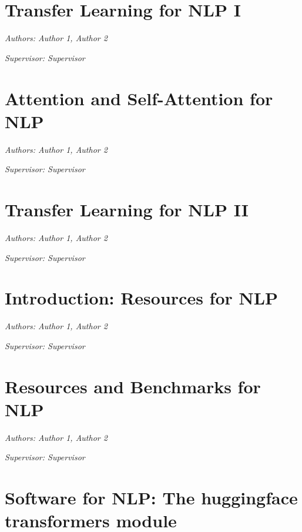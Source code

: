 \documentclass[]{krantz}
\begin{document}
\hypertarget{transfer-learning-for-nlp-i}{%
\chapter{Transfer Learning for NLP I}\label{transfer-learning-for-nlp-i}}

\emph{Authors: Author 1, Author 2}

\emph{Supervisor: Supervisor}

\hypertarget{attention-and-self-attention-for-nlp}{%
\chapter{Attention and Self-Attention for NLP}\label{attention-and-self-attention-for-nlp}}

\emph{Authors: Author 1, Author 2}

\emph{Supervisor: Supervisor}

\hypertarget{transfer-learning-for-nlp-ii}{%
\chapter{Transfer Learning for NLP II}\label{transfer-learning-for-nlp-ii}}

\emph{Authors: Author 1, Author 2}

\emph{Supervisor: Supervisor}

\hypertarget{introduction-resources-for-nlp}{%
\chapter{Introduction: Resources for NLP}\label{introduction-resources-for-nlp}}

\emph{Authors: Author 1, Author 2}

\emph{Supervisor: Supervisor}

\hypertarget{resources-and-benchmarks-for-nlp}{%
\chapter{Resources and Benchmarks for NLP}\label{resources-and-benchmarks-for-nlp}}

\emph{Authors: Author 1, Author 2}

\emph{Supervisor: Supervisor}

\hypertarget{software-for-nlp-the-huggingface-transformers-module}{%
\chapter{Software for NLP: The huggingface transformers module}\label{software-for-nlp-the-huggingface-transformers-module}}
\end{document}
